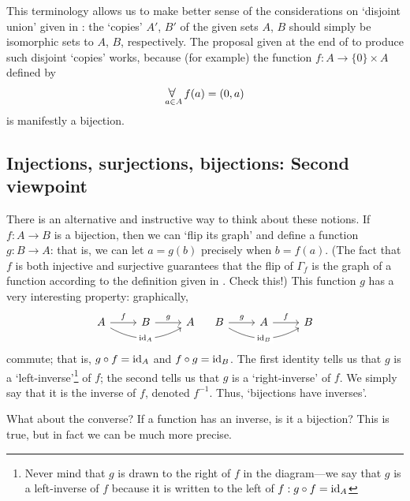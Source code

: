 This terminology allows us to make better sense of the considerations
on `disjoint union' given in
: the `copies' $A'$,
$B'$ of the given sets $A$, $B$ should simply be isomorphic sets to
$A$, $B$, respectively. The proposal given at the end of
 to produce such
disjoint `copies' works, because (for example) the function
$f : A \to \{0\} \times A$ defined by
\[\kforall_{a \in A} f (a) = (0, a)\] is manifestly a bijection.

\subsection{Injections, surjections, bijections: Second viewpoint}%
\label{subsec:prelims:injections-surjections-bijections-second-viewpoint}
There is an alternative and instructive way to think about these
notions.  If $f : A \to B$ is a bijection, then we can `flip its
graph' and define a function $g : B \to A$: that is, we can let
$a = g(b)$ precisely when $b = f (a)$. (The fact that $f$ is both
injective and surjective guarantees that the flip of $\Gamma_f$ is the
graph of a function according to the definition given in
. Check this!)  This
function $g$ has a very interesting property: graphically,
\[
  \begin{tikzcd}
    A \arrow[r,"f"] \arrow[rr,bend right,"\id_A" description]&
    B\arrow[r,"g"] &A
  \end{tikzcd}
  \quad
  \begin{tikzcd}
    B\arrow[r,"g"]\arrow[rr,bend right,"\id_B" description]
    &A\arrow[r,"f"]&B
  \end{tikzcd}
\] commute; that is, $g \circ f = \operatorname{id}_A$ and $f \circ g = \operatorname{id}_B$. The
first identity tells us that $g$ is a `left-inverse'\footnote{Never
  mind that $g$ is drawn to the right of $f$ in the diagram---we say
  that $g$ is a left-inverse of $f$ because it is written to the left
  of $f : g \circ f = \operatorname{id}_A$} of $f$; the second tells us that $g$ is
a `right-inverse' of $f$. We simply say that it is the inverse of $f$,
denoted $f^{-1}$. Thus, `bijections have inverses'.

What about the converse? If a function has an inverse, is it a
bijection? This is true, but in fact we can be much more precise.

